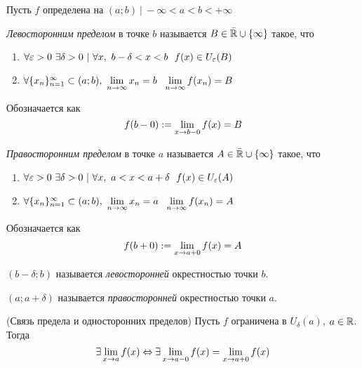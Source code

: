 \begin{definition}
	Пусть $f$ определена на $(a; b)\ |\ -\infty < a < b < +\infty$
	
	\textit{Левосторонним пределом} в точке $b$ называется $B \in \bar{\mathbb{R}} \cup \{\infty\}$ такое, что
	\begin{enumerate}
		\item $\forall \varepsilon > 0\ \exists \delta > 0\ |\ \forall x,\ b - \delta < x < b\ \ f(x) \in U_{\varepsilon}(B)$
		
		\item $\forall \{x_n\}_{n = 1}^\infty \subset (a; b),\ \lim\limits_{n \to \infty} x_n = b\ \ \lim\limits_{n \to \infty} f(x_n) = B$
	\end{enumerate}
	Обозначается как
	\[
		f(b - 0) := \lim\limits_{x \to b-0} f(x) = B
	\]

	\textit{Правосторонним пределом} в точке $a$ называется $A \in \bar{\mathbb{R}} \cup \{\infty\}$ такое, что
	\begin{enumerate}
		\item $\forall \varepsilon > 0\ \exists \delta > 0\ |\ \forall x,\ a < x < a + \delta\ \ f(x) \in U_{\varepsilon}(A)$
		
		\item $\forall \{x_n\}_{n = 1}^\infty \subset (a; b),\ \lim\limits_{n \to \infty} x_n = a\ \ \lim\limits_{n \to \infty} f(x_n) = A$
	\end{enumerate}
	Обозначается как
	\[
	f(b + 0) := \lim\limits_{x \to a+0} f(x) = A
	\]	
\end{definition}

\begin{definition}
	$(b - \delta; b)$ называется \textit{левосторонней} окрестностью точки $b$.
	
	$(a; a + \delta)$ называется \textit{правосторонней} окрестностью точки $a$.
\end{definition}

\begin{theorem} (Связь предела и односторонних пределов)
	Пусть $f$ ограничена в $U_{\delta}(a)$, $a \in \mathbb{R}$. Тогда
	$$
		\exists \lim\limits_{x \to a} f(x) \Leftrightarrow \exists \lim\limits_{x \to a-0} f(x) = \lim\limits_{x \to a+0} f(x)
	$$
\end{theorem}

